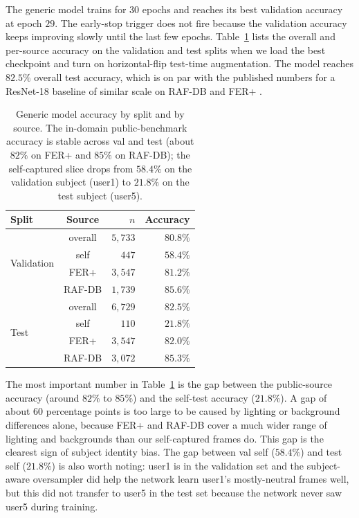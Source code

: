 \documentclass[12pt,a4paper]{article}
\begin{document}
The generic model trains for $30$ epochs and reaches its best
validation accuracy at epoch $29$. The early-stop trigger does
not fire because the validation accuracy keeps improving slowly
until the last few epochs. Table~\ref{tab:overall} lists the
overall and per-source accuracy on the validation and test
splits when we load the best checkpoint and turn on
horizontal-flip test-time augmentation. The model reaches
$82.5\%$ overall test accuracy, which is on par with the
published numbers for a ResNet-18 baseline of similar scale on
RAF-DB and FER+ \autocite{wang2020ran}.

\begin{table}[H]
  \centering
  \footnotesize
  \begin{tabular}{lcrr}
    \toprule
    Split & Source & $n$ & Accuracy \\
    \midrule
    \multirow{4}{*}{Validation}
        & overall  & $5{,}733$ & $80.8\%$ \\
        & self     & $447$     & $58.4\%$ \\
        & FER+     & $3{,}547$ & $81.2\%$ \\
        & RAF-DB   & $1{,}739$ & $85.6\%$ \\
    \midrule
    \multirow{4}{*}{Test}
        & overall  & $6{,}729$ & $82.5\%$ \\
        & self     & $110$     & $21.8\%$ \\
        & FER+     & $3{,}547$ & $82.0\%$ \\
        & RAF-DB   & $3{,}072$ & $85.3\%$ \\
    \bottomrule
  \end{tabular}
  \caption{\footnotesize Generic model accuracy by split and by source. The
  in-domain public-benchmark accuracy is stable across val and
  test (about $82\%$ on FER+ and $85\%$ on RAF-DB); the
  self-captured slice drops from $58.4\%$ on the validation
  subject (user1) to $21.8\%$ on the test subject (user5).}
  \label{tab:overall}
\end{table}

The most important number in Table~\ref{tab:overall} is the
gap between the public-source accuracy (around $82\%$ to $85\%$)
and the self-test accuracy ($21.8\%$). A gap of about
$60$ percentage points is too large to be caused by lighting or
background differences alone, because FER+ and RAF-DB cover a
much wider range of lighting and backgrounds than our
self-captured frames do. This gap is the clearest sign of
subject identity bias. The gap between val self ($58.4\%$) and
test self ($21.8\%$) is also worth noting: user1 is in the
validation set and the subject-aware oversampler did help the
network learn user1's mostly-neutral frames well, but this did
not transfer to user5 in the test set because the network never
saw user5 during training.
\end{document}
